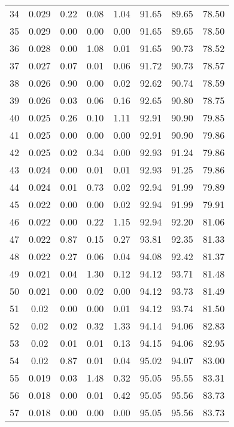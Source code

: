\begin{longtable}{cccccccc}
    34    & 0.029 & 0.22  & 0.08  & 1.04  & 91.65 & 89.65 & 78.50 \\
    35    & 0.029 & 0.00  & 0.00  & 0.00  & 91.65 & 89.65 & 78.50 \\
    36    & 0.028 & 0.00  & 1.08  & 0.01  & 91.65 & 90.73 & 78.52 \\
    37    & 0.027 & 0.07  & 0.01  & 0.06  & 91.72 & 90.73 & 78.57 \\
    38    & 0.026 & 0.90  & 0.00  & 0.02  & 92.62 & 90.74 & 78.59 \\
    39    & 0.026 & 0.03  & 0.06  & 0.16  & 92.65 & 90.80 & 78.75 \\
    40    & 0.025 & 0.26  & 0.10  & 1.11  & 92.91 & 90.90 & 79.85 \\
    41    & 0.025 & 0.00  & 0.00  & 0.00  & 92.91 & 90.90 & 79.86 \\
    42    & 0.025 & 0.02  & 0.34  & 0.00  & 92.93 & 91.24 & 79.86 \\
    43    & 0.024 & 0.00  & 0.01  & 0.01  & 92.93 & 91.25 & 79.86 \\
    44    & 0.024 & 0.01  & 0.73  & 0.02  & 92.94 & 91.99 & 79.89 \\
    45    & 0.022 & 0.00  & 0.00  & 0.02  & 92.94 & 91.99 & 79.91 \\
    46    & 0.022 & 0.00  & 0.22  & 1.15  & 92.94 & 92.20 & 81.06 \\
    47    & 0.022 & 0.87  & 0.15  & 0.27  & 93.81 & 92.35 & 81.33 \\
    48    & 0.022 & 0.27  & 0.06  & 0.04  & 94.08 & 92.42 & 81.37 \\
    49    & 0.021 & 0.04  & 1.30  & 0.12  & 94.12 & 93.71 & 81.48 \\
    50    & 0.021 & 0.00  & 0.02  & 0.00  & 94.12 & 93.73 & 81.49 \\
    51    & 0.02  & 0.00  & 0.00  & 0.01  & 94.12 & 93.74 & 81.50 \\
    52    & 0.02  & 0.02  & 0.32  & 1.33  & 94.14 & 94.06 & 82.83 \\
    53    & 0.02  & 0.01  & 0.01  & 0.13  & 94.15 & 94.06 & 82.95 \\
    54    & 0.02  & 0.87  & 0.01  & 0.04  & 95.02 & 94.07 & 83.00 \\
    55    & 0.019 & 0.03  & 1.48  & 0.32  & 95.05 & 95.55 & 83.31 \\
    56    & 0.018 & 0.00  & 0.01  & 0.42  & 95.05 & 95.56 & 83.73 \\
    57    & 0.018 & 0.00  & 0.00  & 0.00  & 95.05 & 95.56 & 83.73 \\

\end{longtable}
